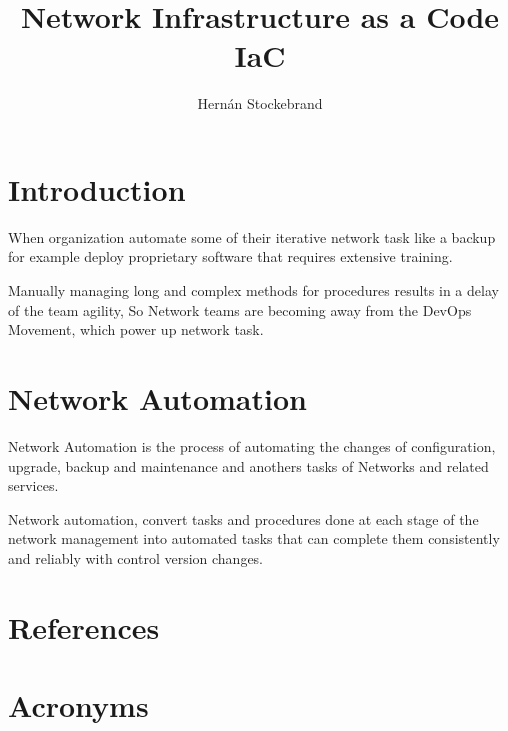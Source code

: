 \documentclass[PMO,lsstdraft,authoryear,toc]{lsstdoc}
\title{Network Infrastructure as a Code IaC}
\author{%
Hernán Stockebrand
}
\date{\vcsDate}
\begin{document}
\maketitle

\section{Introduction}

When organization automate some of their iterative network task like a backup for example deploy proprietary software that requires extensive training.

Manually managing long and complex methods for procedures results in a delay of the team agility, So Network teams are becoming away from the DevOps Movement, which power up network task.

\section{Network Automation}

Network Automation is the process of automating the changes of configuration, upgrade, backup and maintenance and anothers tasks of Networks and related services. 

Network automation, convert tasks and procedures done at each stage of the network management into automated tasks that can complete them consistently and reliably with control version changes.





\appendix
\section{References} \label{sec:bib}
\renewcommand{\refname}{} %


\section{Acronyms} \label{sec:acronyms}

\end{document}
